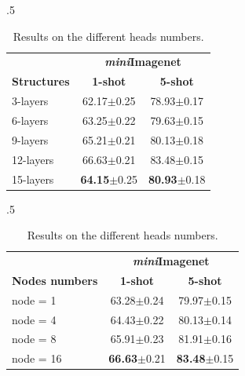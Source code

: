 \begin{table}[ht]
\caption{Effect of transformer structures}
 \begin{subtable}{.5\linewidth}
\caption{Results on the different transformer structures.}
\centering
\begin{tabular}{lcc}
\toprule 
 &  \multicolumn{2}{c}{\textbf{\textit{mini}Imagenet}}  \\
\textbf{Structures} & \textbf{1-shot} & \textbf{5-shot}   \\
\midrule 
3-layers  & 62.17\textcolor{mygray}{\scriptsize{$\pm$0.25}} & 78.93\textcolor{mygray}{\scriptsize{$\pm$0.17}} \\
6-layers & 63.25\textcolor{mygray}{\scriptsize{$\pm$0.22}} & 79.63\textcolor{mygray}{\scriptsize{$\pm$0.15}}  \\
9-layers & 65.21\textcolor{mygray}{\scriptsize{$\pm$0.21}} & 80.13\textcolor{mygray}{\scriptsize{$\pm$0.18}}  \\
\rowcolor{softblue}
12-layers & 66.63\textcolor{mygray}{\scriptsize{$\pm$0.21}} & 83.48\textcolor{mygray}{\scriptsize{$\pm$0.15}}  \\
{15-layers}  & \textbf{64.15}\textcolor{mygray}{\scriptsize{$\pm$0.25}} & \textbf{80.93}\textcolor{mygray}{\scriptsize{$\pm$0.18}} 
\\
\bottomrule
\end{tabular}
\label{tab:transformer}
\end{subtable}
 \begin{subtable}{.5\linewidth}
\caption{Results on the different heads numbers.}
\centering
\begin{tabular}{lcc}
\toprule 
 &  \multicolumn{2}{c}{\textbf{\textit{mini}Imagenet}}  \\
\textbf{Nodes numbers} & \textbf{1-shot} & \textbf{5-shot}   \\
\midrule 
node  = 1   & 63.28\textcolor{mygray}{\scriptsize{$\pm$0.24}} & 79.97\textcolor{mygray}{\scriptsize{$\pm$0.15}} \\
node  = 4 & 64.43\textcolor{mygray}{\scriptsize{$\pm$0.22}} & 80.13\textcolor{mygray}{\scriptsize{$\pm$0.14}}  \\
node  = 8 & 65.91\textcolor{mygray}{\scriptsize{$\pm$0.23}} & 81.91\textcolor{mygray}{\scriptsize{$\pm$0.16}}  \\
\rowcolor{softblue}
node  = 16 & \textbf{66.63}\textcolor{mygray}{\scriptsize{$\pm$0.21}} & \textbf{83.48}\textcolor{mygray}{\scriptsize{$\pm$0.15}} 
\\
\bottomrule
\end{tabular}
\label{tab:head_num}
\end{subtable}
\end{table}



